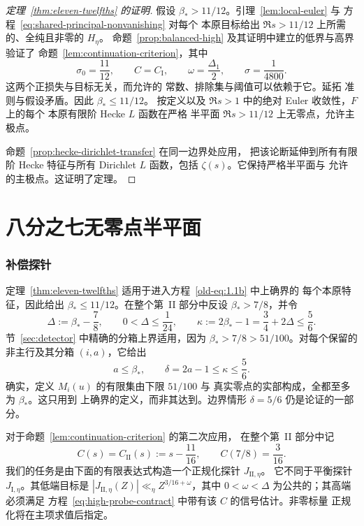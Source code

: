 \begin{proof}[定理~\ref{thm:eleven-twelfths} 的证明]
假设 $\beta_*>11/12$。引理~\ref{lem:local-euler} 与
方程~\eqref{eq:shared-principal-nonvanishing} 对每个
本原目标给出 $\Re s>11/12$ 上所需的、全纯且非零的 $H_\eta$。
命题~\ref{prop:balanced-high} 及其证明中建立的低界与高界验证了
命题~\ref{lem:continuation-criterion}，其中
\[
 \sigma_0=\frac{11}{12},\qquad C=C_{\mathrm I},\qquad
 \omega=\frac{\Delta_1}{2},\qquad \sigma=\frac1{4800}.
\]
这两个正损失与目标无关，而允许的
常数、排除集与阈值可以依赖于它。延拓
准则与假设矛盾。因此 $\beta_*\le11/12$。
按定义以及 $\Re s>1$ 中的绝对 Euler 收敛性，$F$ 上的每个
本原有限阶 Hecke $L$ 函数在严格
半平面 $\Re s>11/12$ 上无零点，允许主极点。

命题~\ref{prop:hecke-dirichlet-transfer} 在同一边界处应用，
把该论断延伸到所有有限阶 Hecke 特征与所有 Dirichlet
$L$ 函数，包括 $\zeta(s)$。它保持严格半平面与
允许的主极点。这证明了定理。
\end{proof}

\part{八分之七无零点半平面}
\label{part:seven-eighths}

\section{补偿探针}\label{sec:compensation}

定理~\ref{thm:eleven-twelfths} 适用于进入方程~\eqref{old-eq:1.1b} 中上确界的
每个本原特征，因此给出
$\beta_*\le11/12$。在整个第~II 部分中反设
$\beta_*>7/8$，并令
\begin{equation}\label{eq:part-II-bootstrap}
 \Delta:=\beta_*-\frac78,\qquad 0<\Delta\le\frac1{24},
 \qquad
 \kappa:=2\beta_*-1=\frac34+2\Delta\le\frac56.
\end{equation}
节~\ref{sec:detector} 中精确的分箱上界适用，因为
$\beta_*>7/8>51/100$。对每个保留的非主行及其分箱
$(i,a)$，它给出
\begin{equation}\label{eq:part-II-bin-ceiling}
 a\le\beta_*,\qquad \delta=2a-1\le\kappa\le\frac56.
\end{equation}
确实，定义 $M_i(u)$ 的有限集由下限 $51/100$ 与
真实零点的实部构成，全都至多为 $\beta_*$。这只用到
上确界的定义，而非其达到。边界情形
$\delta=5/6$ 仍是论证的一部分。

对于命题~\ref{lem:continuation-criterion} 的第二次应用，
在整个第~II 部分中记
\begin{equation}\label{eq:part-II-mellin-target}
 C(s)=C_{\mathrm{II}}(s):=s-\frac{11}{16},\qquad
 C(7/8)=\frac3{16}.
\end{equation}
我们的任务是由下面的有限表达式构造一个正规化探针 $J_{\mathrm{II},\eta}$。
它不同于平衡探针
$J_{\mathrm I,\eta}$。其低端目标是
$|J_{\mathrm{II},\eta}(Z)|\ll_\eta Z^{3/16+\omega}$，其中
$0<\omega<\Delta$ 为公共的；其高端必须满足
方程~\eqref{eq:high-probe-contract} 中带有该 $C$ 的信号估计。非零标量
正规化将在主项求值后指定。


